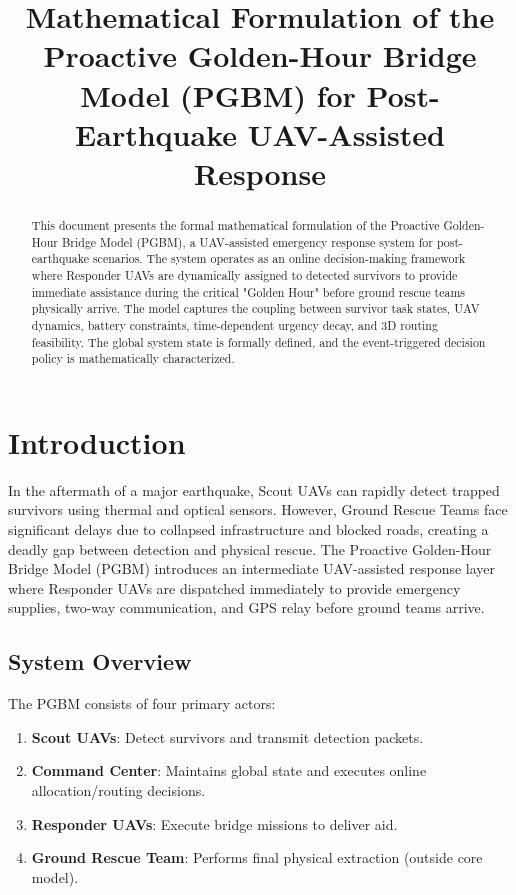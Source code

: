 \documentclass[conference]{IEEEtran}
\title{Mathematical Formulation of the Proactive Golden-Hour Bridge Model (PGBM) for Post-Earthquake UAV-Assisted Response}
\author{\IEEEauthorblockN{Author Name}
\IEEEauthorblockA{\textit{Department of Computer Science and Engineering}\\
\textit{University Name}\\
Email: author@email.com}
}
\begin{document}
\maketitle

\begin{abstract}
This document presents the formal mathematical formulation of the Proactive Golden-Hour Bridge Model (PGBM), a UAV-assisted emergency response system for post-earthquake scenarios. The system operates as an online decision-making framework where Responder UAVs are dynamically assigned to detected survivors to provide immediate assistance during the critical "Golden Hour" before ground rescue teams physically arrive. The model captures the coupling between survivor task states, UAV dynamics, battery constraints, time-dependent urgency decay, and 3D routing feasibility. The global system state is formally defined, and the event-triggered decision policy is mathematically characterized.
\end{abstract}

\section{Introduction}
In the aftermath of a major earthquake, Scout UAVs can rapidly detect trapped survivors using thermal and optical sensors. However, Ground Rescue Teams face significant delays due to collapsed infrastructure and blocked roads, creating a deadly gap between detection and physical rescue. The Proactive Golden-Hour Bridge Model (PGBM) introduces an intermediate UAV-assisted response layer where Responder UAVs are dispatched immediately to provide emergency supplies, two-way communication, and GPS relay before ground teams arrive.

\subsection{System Overview}
The PGBM consists of four primary actors:
\begin{enumerate}
\item \textbf{Scout UAVs}: Detect survivors and transmit detection packets.
\item \textbf{Command Center}: Maintains global state and executes online allocation/routing decisions.
\item \textbf{Responder UAVs}: Execute bridge missions to deliver aid.
\item \textbf{Ground Rescue Team}: Performs final physical extraction (outside core model).
\end{enumerate}
\end{document}
